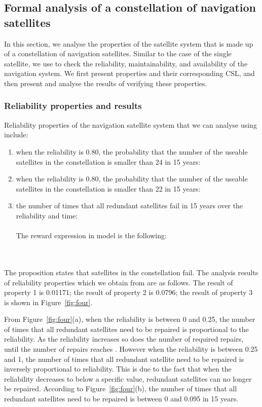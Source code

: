 \documentclass[preprint,12pt]{qrei}
\begin{document}
\subsection{Formal analysis of a constellation of navigation satellites}

In this section, we analyse the properties of the satellite system that is made up of a constellation of navigation satellites. Similar to the case of the single satellite, we use  to check the reliability, maintainability, and availability of the navigation system. We first present properties and their corresponding CSL, and then present and analyse the results of verifying these properties.

\subsubsection{Reliability properties and results}

Reliability properties of the navigation satellite system that we can analyse using  include:

\begin{enumerate}
\item when the reliability is 0.80, the probability that the number of the useable satellites in the constellation is smaller than 24 in 15 years:\\

\item when the reliability is 0.80, the probability that the number of the useable satellites in the constellation is smaller than 22 in 15 years:\\

\item the number of times that all redundant satellites fail in 15 years over the reliability and time:\\
\\
The reward expression in  model is the following:\\
\\
\\

\end{enumerate}

The proposition  states that  satellites in the constellation fail.
The analysis results of reliability properties which we obtain from  are as follows. The result of property 1 is 0.01171; the result of property 2 is 0.0796; the result of property 3 is shown in Figure~\ref{fig:four}.

From Figure~\ref{fig:four}(a), when the reliability is between 0 and 0.25, the number of times that all redundant satellites need to be repaired is proportional to the reliability. As the reliability increases so does the number of required repairs, until the number of repairs reaches . However when the reliability is between 0.25 and 1, the number of times that all redundant satellite need to be repaired is inversely proportional to reliability. This is due to the fact that when the reliability decreases to below a specific value, redundant satellites can no longer be repaired. According to Figure~\ref{fig:four}(b), the number of times that all redundant satellites need to be repaired is between 0 and 0.095 in 15 years.
\end{document}
